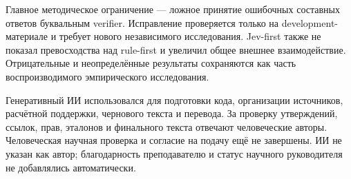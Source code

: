 \documentclass[14pt,a4paper]{extarticle}
\begin{document}
Главное методическое ограничение --- ложное принятие ошибочных составных ответов буквальным verifier. Исправление проверяется только на development-материале и требует нового независимого исследования. Jev-first также не показал превосходства над rule-first и увеличил общее внешнее взаимодействие. Отрицательные и неопределённые результаты сохраняются как часть воспроизводимого эмпирического исследования.


Генеративный ИИ использовался для подготовки кода, организации источников, расчётной поддержки, чернового текста и перевода. За проверку утверждений, ссылок, прав, эталонов и финального текста отвечают человеческие авторы. Человеческая научная проверка и согласие на подачу ещё не завершены. ИИ не указан как автор; благодарность преподавателю и статус научного руководителя не добавлялись автоматически.
\end{document}
